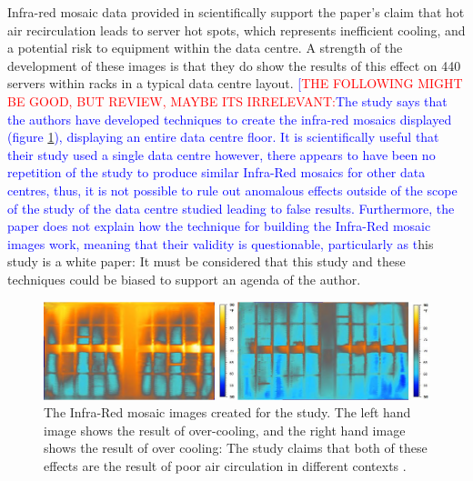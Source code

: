 Infra-red mosaic data provided in \cite[Optimizing Air Temperature Set Points and Air Flows Can Shrink PUE Numbers]{SeeberAndSeeberImprovingDataCenterEnergyEfficiencyThroughEnvironmentalOptimization} scientifically support the paper's claim that hot air \gls{recirculation} leads to server hot spots, which represents inefficient cooling, and a potential risk to equipment within the \gls{data centre}. A strength of the development of these images is that they do show the results of this effect on 440 servers within racks in a typical \gls{data centre} layout. \textcolor{blue}{[}\textcolor{red}{THE FOLLOWING MIGHT BE GOOD, BUT REVIEW, MAYBE ITS IRRELEVANT:}\textcolor{blue}{The study says that the authors have developed techniques to create the infra-red mosaics displayed (figure \ref{fig:SeeberAndSeeberIRMosaics}), displaying an entire \gls{data centre} floor. It is scientifically useful that their study used a single data centre however, there appears to have been no repetition of the study to produce similar Infra-Red mosaics for other data centres, thus, it is not possible to rule out anomalous effects outside of the scope of the study of the data centre studied leading to false results. Furthermore, the paper does not explain how the technique for building the Infra-Red mosaic images work, meaning that their validity is questionable, particularly as t}his study is a white paper: It must be considered that this study and these techniques could be biased to support an agenda of the author.

\begin{figure}[H]
\centering
\includegraphics[width=5in]{Resources//S Seeber and W Seeber- IRMosaicImages.png}
\caption{The Infra-Red mosaic images created for the study. The left hand image shows the result of over-cooling, and the right hand image shows the result of over cooling: The study claims that both of these effects are the result of poor air circulation in different contexts \cite[Optimizing Air Temperature Set Points and Air Flows Can Shrink PUE Numbers]{SeeberAndSeeberImprovingDataCenterEnergyEfficiencyThroughEnvironmentalOptimization}.}
\label{fig:SeeberAndSeeberIRMosaics}
\end{figure}


